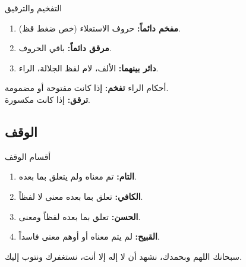 \documentclass[aspectratio=169, 12pt]{beamer}
\begin{document}
\begin{frame}{التفخيم والترقيق}
    \begin{enumerate}
        \item \textbf{مفخم دائماً:} حروف الاستعلاء (خص ضغط قظ).
        \item \textbf{مرقق دائماً:} باقي الحروف.
        \item \textbf{دائر بينهما:} الألف، لام لفظ الجلالة، الراء.
    \end{enumerate}
    \begin{block}{أحكام الراء}
        \textbf{تفخم:} إذا كانت مفتوحة أو مضمومة. \\
        \textbf{ترقق:} إذا كانت مكسورة.
    \end{block}
\end{frame}

\subsection{الوقف}
\begin{frame}{أقسام الوقف}
    \begin{enumerate}
        \item \textbf{التام:} تم معناه ولم يتعلق بما بعده.
        \item \textbf{الكافي:} تعلق بما بعده معنى لا لفظاً.
        \item \textbf{الحسن:} تعلق بما بعده لفظاً ومعنى.
        \item \textbf{القبيح:} لم يتم معناه أو أوهم معنى فاسداً.
    \end{enumerate}
\end{frame}

\begin{frame}
    \centering
    \Huge سبحانك اللهم وبحمدك، نشهد أن لا إله إلا أنت، نستغفرك ونتوب إليك.
\end{frame}
\end{document}
